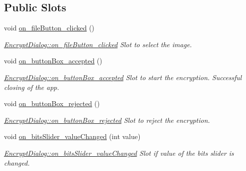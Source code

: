 \subsection*{Public Slots}
\begin{DoxyCompactItemize}
\item 
void \hyperlink{class_encrypt_dialog_ac9817d3f11f44f4bb8d97a228fbdf8a5}{on\-\_\-file\-Button\-\_\-clicked} ()
\begin{DoxyCompactList}\small\item\em \hyperlink{class_encrypt_dialog_ac9817d3f11f44f4bb8d97a228fbdf8a5}{Encrypt\-Dialog\-::on\-\_\-file\-Button\-\_\-clicked} Slot to select the image. \end{DoxyCompactList}\item 
void \hyperlink{class_encrypt_dialog_a9a998acd37db458eede31f4a9cb16b78}{on\-\_\-button\-Box\-\_\-accepted} ()
\begin{DoxyCompactList}\small\item\em \hyperlink{class_encrypt_dialog_a9a998acd37db458eede31f4a9cb16b78}{Encrypt\-Dialog\-::on\-\_\-button\-Box\-\_\-accepted} Slot to start the encryption. Successful closing of the app. \end{DoxyCompactList}\item 
void \hyperlink{class_encrypt_dialog_a43deb5fd2be501f4d03582a8ed49e9c2}{on\-\_\-button\-Box\-\_\-rejected} ()
\begin{DoxyCompactList}\small\item\em \hyperlink{class_encrypt_dialog_a43deb5fd2be501f4d03582a8ed49e9c2}{Encrypt\-Dialog\-::on\-\_\-button\-Box\-\_\-rejected} Slot to reject the encryption. \end{DoxyCompactList}\item 
void \hyperlink{class_encrypt_dialog_ae5975a58b8ed8f7e423e5d5cc5f58dce}{on\-\_\-bits\-Slider\-\_\-value\-Changed} (int value)
\begin{DoxyCompactList}\small\item\em \hyperlink{class_encrypt_dialog_ae5975a58b8ed8f7e423e5d5cc5f58dce}{Encrypt\-Dialog\-::on\-\_\-bits\-Slider\-\_\-value\-Changed} Slot if value of the bits slider is changed. \end{DoxyCompactList}\end{DoxyCompactItemize}
